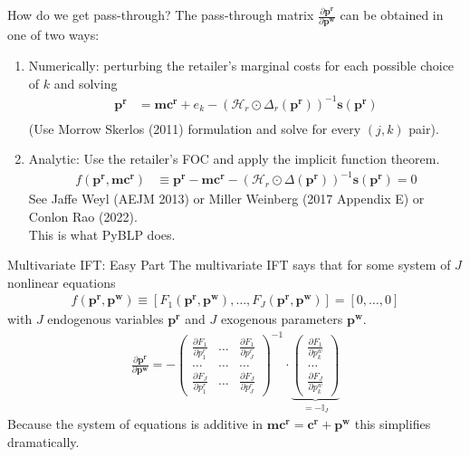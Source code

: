 \begin{frame}{How do we get pass-through?}
The \alert{pass-through matrix} $\frac{\partial \symbf{p^r}}{\partial \symbf{p^w}}$ can be obtained in one of two ways:
\begin{enumerate}
\item Numerically: perturbing the retailer's marginal costs for each possible choice of $k$ and solving
\begin{align*}
\symbf{p^r} &=\symbf{mc^r} + e_k -(\mathcal{H}_r \odot \Delta_{r}(\symbf{p^r}))^{-1} \symbf{s}(\symbf{p^r})\\
\end{align*}
(Use Morrow Skerlos (2011) formulation and solve for every $(j,k)$ pair).
\item Analytic: Use the retailer's FOC and apply the implicit function theorem.
\begin{align}
\tag{retailer FOC}
 f(\symbf{p^r},\symbf{mc^r}) &\equiv \symbf{p^r}  - \symbf{mc^r}-  \left(\mathcal{H}_{r} \odot \Delta(\symbf{p^r}) \right)^{-1} \symbf{s}(\symbf{p^r})=0 
\end{align}
See Jaffe Weyl (AEJM 2013) or Miller Weinberg (2017 Appendix E) or Conlon Rao (2022).\\
\alert{This is what PyBLP does}.
  \end{enumerate}

\end{frame}

\begin{frame}{Multivariate IFT: Easy Part}
The multivariate IFT says that for some system of $J$ nonlinear equations 
\begin{align*}
f(\symbf{p^r},\symbf{p^w}) \equiv [F_1(\symbf{p^r},\symbf{p^w}), \ldots, F_J(\symbf{p^r},\symbf{p^w})]=[0,\ldots,0]
\end{align*}
with $J$ endogenous variables $\symbf{p^r}$ and $J$ exogenous parameters $\symbf{p^w}$.
\begin{align}
\label{eq:ptr_matrix}
\tag{PTR}
\frac{\partial \symbf{p^r}}{\partial \symbf{p^w}}
=-\left(\begin{array}{ccc}
\frac{\partial F_{1}}{\partial p_{1}^r} & \ldots & \frac{\partial F_{1}}{\partial p_{J}^r} \\
\ldots & \ldots & \ldots \\
\frac{\partial F_{J}}{\partial p_{1}^r} & \ldots & \frac{\partial F_{J}}{\partial p_{J}^r}
\end{array}\right)^{-1} \cdot \underbrace{\left(\begin{array}{l}
\frac{\partial F_{1}}{\partial p_{k}^w} \\
\ldots \\
\frac{\partial F_{J}}{\partial p_{k}^w}
\end{array}\right)}_{= -\mathbb{I}_J}
\end{align}
Because the system of equations is additive in $\symbf{mc^r} = \symbf{c^r} + \symbf{p^w}$ this simplifies dramatically.
\end{frame}


